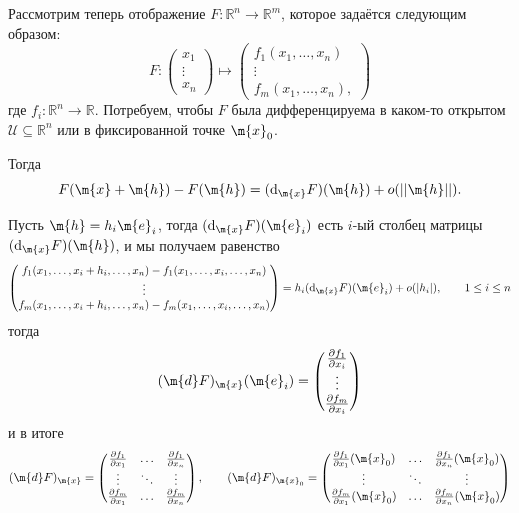 Рассмотрим теперь отображение $F: \mathbb{R}^n \to \mathbb{R}^m$, которое задаётся следующим образом:
\[
 F: \begin{pmatrix}
      x_1 \\ \vdots \\ x_n
 \end{pmatrix} \mapsto 
 \begin{pmatrix}
     f_1(x_1, \ldots, x_n) \\ \vdots \\ f_m(x_1, \ldots, x_n),
 \end{pmatrix}
\]
где $f_i:\mathbb{R}^n \to \mathbb{R}$. Потребуем, чтобы $F$ была дифференцируема в каком-то открытом $\mathscr{U} \subseteq \mathbb{R}^n$ или в фиксированной точке $\m{x}_0$. 

Тогда 
\[
 F(\m{x} + \m{h}) - F(\m{h}) = (\mathrm{d}_\m{x}F)(\m{h}) + o(||\m{h}||).
\]

Пусть $\m{h} = h_i \m{e}_i$, тогда $(\mathrm{d}_\m{x}F)(\m{e}_i)$ есть $i$-ый столбец матрицы $(\mathrm{d}_\m{x}F)(\m{h})$, и мы получаем равенство
\[
 \begin{pmatrix}
     f_1(x_1, \ldots, x_i + h_i, \ldots, x_n) -f_1(x_1, \ldots, x_i, \ldots, x_n) \\
     \vdots \\
     f_m(x_1, \ldots, x_i + h_i, \ldots, x_n) -f_m(x_1, \ldots, x_i, \ldots, x_n)
 \end{pmatrix} = h_i(\mathrm{d}_\m{x}F)(\m{e}_i) + o(|h_i|), \qquad 1 \le i \le n
\]
тогда
\[
 (\m{d}F)_\m{x}(\m{e}_i) = \begin{pmatrix}
     \frac{\partial f_1}{\partial x_i} \\ \vdots \\ \frac{\partial f_m}{\partial x_i}
 \end{pmatrix}
\]
и в итоге
\[
 (\m{d}F)_\m{x} = \begin{pmatrix}
     \frac{\partial f_1}{\partial x_1} & \ldots & \frac{\partial f_1}{\partial x_n} \\
     \vdots & \ddots & \vdots \\
     \frac{\partial f_m}{\partial x_1} & \ldots & \frac{\partial f_m}{\partial x_n}
 \end{pmatrix}, \qquad 
 (\m{d}F)_{\m{x}_0} = \begin{pmatrix}
     \frac{\partial f_1}{\partial x_1}({\m{x}_0}) & \ldots & \frac{\partial f_1}{\partial x_n} ({\m{x}_0}) \\
     \vdots & \ddots & \vdots \\
     \frac{\partial f_m}{\partial x_1} ({\m{x}_0}) & \ldots & \frac{\partial f_m}{\partial x_n} ({\m{x}_0})
     \end{pmatrix}
    \]

